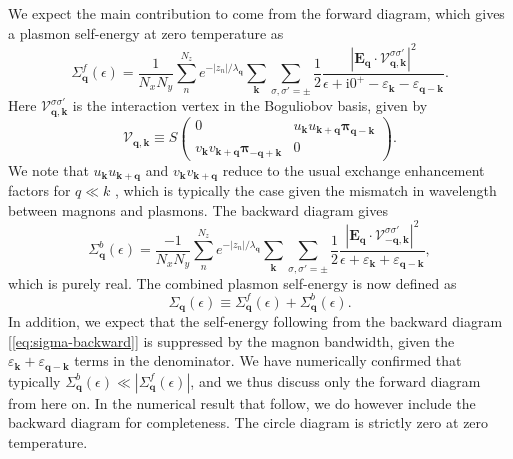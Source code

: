 \documentclass[aps,prb,reprint,twocolumns,superscriptaddress,nofootinbib]{revtex4-2}
\newcommand{\ii}{\mathrm{i}}
\begin{document}
	
	We expect the main contribution to come from the forward diagram, which gives a plasmon self-energy at zero temperature as
	\begin{equation}
		\Sigma^f_{\bm q}(\epsilon)= \frac{1}{N_xN_y}\sum_n^{N_z}e^{- |z_n|/\lambda_{\bm q}} \sum_{\bm k}\sum_{\sigma,\sigma'=\pm}\frac12 \frac{|\bm E_{\bm q}\cdot\bm{\mathcal V}_{\bm q,\bm k}^{\sigma\sigma'}|^2}{\epsilon + \ii 0^+ -\varepsilon_{\bm k} - \varepsilon_{\bm q-\bm k}}. \label{eq:self-energy}
	\end{equation}
	Here $ \bm{\mathcal V}_{\bm q,\bm k}^{\sigma\sigma'}$ is the interaction vertex in the Boguliobov basis, given by 
	\begin{equation}
		\bm{\mathcal V}_{\bm q,\bm k}\equiv S
		\begin{pmatrix}
			0 & u_{\bm k} u_{\bm k +\bm q} \bm \pi_{\bm q-\bm k} \\
			v_{\bm k} v_{\bm k +\bm q} \bm \pi_{-\bm q+\bm k}& 0
		\end{pmatrix}.
	\end{equation}
	We note that $u_{\bm k}u_{\bm k+\bm q} $ and $v_{\bm k}v_{\bm k+ \bm q} $ reduce to the usual exchange enhancement factors for $q\ll k$ \cite{dyrdalMagnonplasmonHybridizationMediated2023}, which is typically the case given the mismatch in wavelength between magnons and plasmons. The backward diagram gives 
	\begin{equation}
		\Sigma^b_{\bm q}(\epsilon)= \frac{-1}{N_xN_y}\sum_n^{N_z}e^{- |z_n|/\lambda_{\bm q}} \sum_{\bm k}\sum_{\sigma,\sigma'=\pm}\frac12 \frac{|\bm E_{\bm q}\cdot\bm{\mathcal V}_{ -\bm q,\bm k}^{\sigma\sigma'}|^2}{\epsilon  +\varepsilon_{\bm k} + \varepsilon_{\bm q-\bm k}}, \label{eq:sigma-backward}
	\end{equation} 
	which is purely real. The combined plasmon self-energy is now defined as
	\begin{equation}
		\Sigma_{\bm q}(\epsilon) \equiv \Sigma^f_{\bm q}(\epsilon) + \Sigma^b_{\bm q}(\epsilon).
	\end{equation}
	In addition, we expect that the self-energy following from the backward diagram [\cref{eq:sigma-backward}] is suppressed by the magnon bandwidth, given the $\varepsilon_{\bm k} + \varepsilon_{\bm q-\bm k}$ terms in the denominator. We have numerically confirmed that typically $\Sigma_{\bm q}^b(\epsilon)\ll|\Sigma_{\bm q}^f(\epsilon)|$, and we thus discuss only the forward diagram from here on. In the numerical result that follow, we do however include the backward diagram for completeness. The circle diagram is strictly zero at zero temperature.
	
\end{document}
